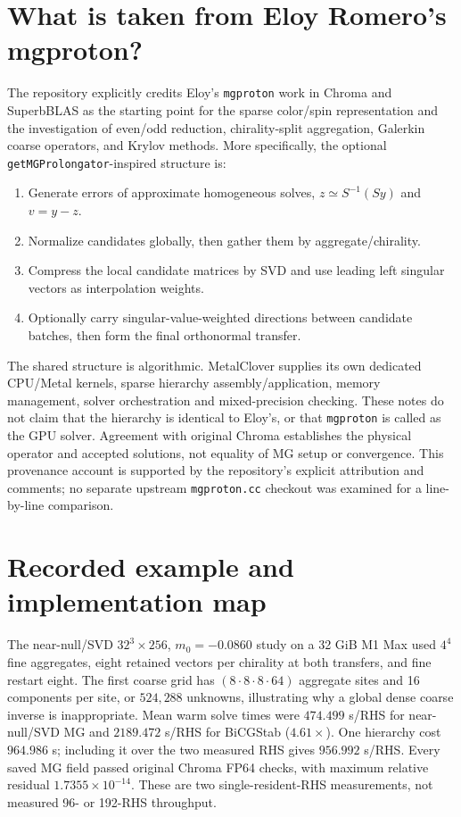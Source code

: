 \documentclass[11pt]{article}
\newcommand{\file}[1]{\nolinkurl{#1}}
\begin{document}
\section{What is taken from Eloy Romero's mgproton?}
The repository explicitly credits Eloy's \file{mgproton} work in Chroma and
SuperbBLAS as the starting point for the sparse color/spin representation and
the investigation of even/odd reduction, chirality-split aggregation, Galerkin
coarse operators, and Krylov methods. More specifically, the optional
\file{getMGProlongator}-inspired structure is:
\begin{enumerate}
 \item Generate errors of approximate homogeneous solves,
       $z\simeq S^{-1}(Sy)$ and $v=y-z$.
 \item Normalize candidates globally, then gather them by aggregate/chirality.
 \item Compress the local candidate matrices by SVD and use leading left
       singular vectors as interpolation weights.
 \item Optionally carry singular-value-weighted directions between candidate
       batches, then form the final orthonormal transfer.
\end{enumerate}
The shared structure is algorithmic. MetalClover supplies its own dedicated
CPU/Metal kernels, sparse hierarchy assembly/application, memory management,
solver orchestration and mixed-precision checking. These notes do not claim
that the hierarchy is identical to Eloy's, or that \file{mgproton} is called
as the GPU solver. Agreement with original Chroma establishes the physical
operator and accepted solutions, not equality of MG setup or convergence.
This provenance account is supported by the repository's explicit attribution
and comments; no separate upstream \file{mgproton.cc} checkout was examined
for a line-by-line comparison.

\section{Recorded example and implementation map}\label{sec:source}
The near-null/SVD $32^3\times256$, $m_0=-0.0860$ study on a 32 GiB M1 Max
used $4^4$ fine aggregates, eight retained vectors per chirality at both
transfers, and fine restart eight. The first coarse grid has
$(8\cdot8\cdot8\cdot64)$ aggregate sites and 16 components per site,
or $524{,}288$ unknowns, illustrating why a global dense coarse inverse is
inappropriate. Mean warm solve times were $474.499$ s/RHS for near-null/SVD MG
and $2189.472$ s/RHS for BiCGStab ($4.61\times$). One hierarchy cost
$964.986$ s; including it over the two measured RHS gives $956.992$ s/RHS.
Every saved MG field passed original Chroma FP64 checks, with maximum relative
residual $1.7355\times10^{-14}$. These are two single-resident-RHS measurements,
not measured 96- or 192-RHS throughput.
\end{document}
